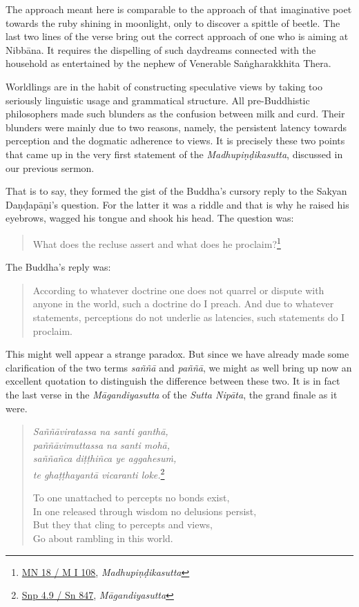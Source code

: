 The approach meant here is comparable to the approach of that imaginative poet towards the ruby shining in moonlight, only to discover a spittle of beetle. The last two lines of the verse bring out the correct approach of one who is aiming at Nibbāna. It requires the dispelling of such daydreams connected with the household as entertained by the nephew of Venerable Saṅgharakkhita Thera.

Worldlings are in the habit of constructing speculative views by taking too seriously linguistic usage and grammatical structure. All pre-Buddhistic philosophers made such blunders as the confusion between milk and curd. Their blunders were mainly due to two reasons, namely, the persistent latency towards perception and the dogmatic adherence to views. It is precisely these two points that came up in the very first statement of the \emph{Madhupiṇḍikasutta}, discussed in our previous sermon.

That is to say, they formed the gist of the Buddha's cursory reply to the Sakyan Daṇḍapāṇi's question. For the latter it was a riddle and that is why he raised his eyebrows, wagged his tongue and shook his head. The question was:

\begin{quote}
What does the recluse assert and what does he proclaim?\footnote{\href{https://suttacentral.net/mn18/pli/ms}{MN 18 / M I 108}, \emph{Madhupiṇḍikasutta}}
\end{quote}

The Buddha's reply was:

\begin{quote}
According to whatever doctrine one does not quarrel or dispute with anyone in the world, such a doctrine do I preach. And due to whatever statements, perceptions do not underlie as latencies, such statements do I proclaim.
\end{quote}

This might well appear a strange paradox. But since we have already made some clarification of the two terms \emph{saññā} and \emph{paññā}, we might as well bring up now an excellent quotation to distinguish the difference between these two. It is in fact the last verse in the \emph{Māgandiyasutta} of the \emph{Sutta Nipāta}, the grand finale as it were.

\begin{quote}
\emph{Saññāviratassa na santi ganthā,}\\
\emph{paññāvimuttassa na santi mohā,}\\
\emph{saññañca diṭṭhiñca ye aggahesuṁ,}\\
\emph{te ghaṭṭhayantā vicaranti loke.}\footnote{\href{https://suttacentral.net/snp4.9/pli/ms}{Snp 4.9 / Sn 847}, \emph{Māgandiyasutta}}

To one unattached to percepts no bonds exist,\\
In one released through wisdom no delusions persist,\\
But they that cling to percepts and views,\\
Go about rambling in this world.
\end{quote}

